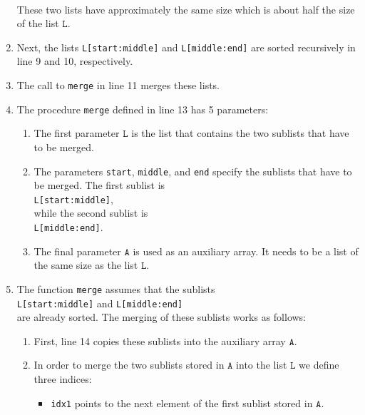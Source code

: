 \begin{enumerate}
      \\[0.2cm]
      These two lists have approximately the same size which is about half the size of the list $\texttt{L}$.
\item Next, the lists \texttt{L[start:middle]} and \texttt{L[middle:end]} are sorted
      recursively in line 9 and 10, respectively.
\item The call to \texttt{merge} in line 11 merges these lists.
\item The procedure \texttt{merge} defined in line 13 has 5 parameters: 
      \begin{enumerate}
      \item The first parameter $\texttt{L}$ is the list that contains the two sublists that have to be merged.
      \item The parameters \texttt{start}, \texttt{middle}, and \texttt{end} specify the sublists
            that have to be merged.  The first sublist is 
            \\[0.2cm]
            \hspace*{1.3cm} 
            \texttt{L[start:middle]}, 
            \\[0.2cm]
            while the second sublist is \\[0.2cm]
            \hspace*{1.3cm} 
            \texttt{L[middle:end]}. 
      \item The final parameter $\texttt{A}$ is used as an auxiliary array.  It needs to be a list of the
            same size as the list $\texttt{L}$.
      \end{enumerate}
\item The function \texttt{merge} assumes that the sublists 
      \\[0.2cm]
      \hspace*{1.3cm}
      \texttt{L[start:middle]} \quad and \quad \texttt{L[middle:end]} 
      \\[0.2cm]
      are already sorted.  The merging of these sublists works as follows:
      \begin{enumerate}
      \item First, line 14 copies these sublists into the auxiliary array $\texttt{A}$.
      \item In order to merge the two sublists stored in $\texttt{A}$ into the list $\texttt{L}$ we define
            three indices: 
            \begin{itemize}
            \item \texttt{idx1} points to the next element of the first sublist stored in $\texttt{A}$.

\end{itemize}
\end{enumerate}
\end{enumerate}
